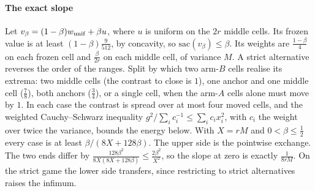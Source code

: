 
\paragraph{The exact slope} Let $v_\beta=(1-\beta)w_{\rm unif}+\beta u$, where $u$ is uniform on
the $2r$ middle cells. Its frozen value is at least $(1-\beta)\frac{9}{512}$, by concavity, so
$\mathrm{sac}(v_\beta)\le\beta$. Its weights are $\frac{1-\beta}{4}$ on each frozen cell and
$\frac{\beta}{2r}$ on each middle cell, of variance $M$. A strict alternative reverses the order of
the ranges. Split by which two arm-$B$ cells realise its extrema: two middle cells (the contrast
to close is $1$), one anchor and one middle cell ($\frac78$), both anchors ($\frac34$), or a
single cell, when the arm-$A$ cells alone must move by $1$. In each case the contrast is spread
over at most four moved cells, and the weighted Cauchy--Schwarz inequality
$g^{2}/\sum_i c_i^{-1}\le\sum_ic_ix_i^{2}$, with $c_i$ the weight over twice the variance, bounds
the energy below. With $X=rM$ and $0<\beta\le\frac12$ every case is at least
$\beta/(8X+128\beta)$. The upper side is the pointwise exchange. The two ends differ by
$\frac{128\beta^{2}}{8X(8X+128\beta)}\le\frac{2\beta^{2}}{X^{2}}$, so the slope at zero is
exactly $\frac1{8rM}$. On the strict game the lower side transfers, since restricting to strict
alternatives raises the infimum.


